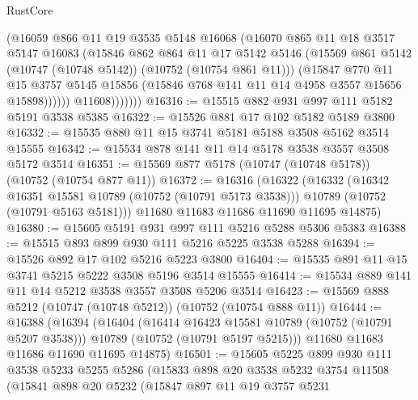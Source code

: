 \begin{lexlean}{RustCore}
\begin{coremodule}
                    (@16059
                      @866
                      @11
                      @19
                      @3535
                      @5148
                      @16068
                      (@16070
                        @865
                        @11
                        @18
                        @3517
                        @5147
                        @16083
                        (@15846
                          @862
                          @864
                          @11
                          @17
                          @5142
                          @5146
                          (@15569 @861 @5142 (@10747 (@10748 @5142)) (@10752 (@10754 @861 @11)))
                          (@15847
                            @770
                            @11
                            @15
                            @3757
                            @5145
                            @15856
                            (@15846 @768 @141 @11 @14 @4958 @3557 @15656 @15898))))))
                  @11608)))))))
@16316 := @15515 @882 @931 @997 @111 @5182 @5191 @3538 @5385
@16322 := @15526 @881 @17 @102 @5182 @5189 @3800
@16332 := @15535 @880 @11 @15 @3741 @5181 @5188 @3508 @5162 @3514 @15555
@16342 := @15534 @878 @141 @11 @14 @5178 @3538 @3557 @3508 @5172 @3514
@16351 := @15569 @877 @5178 (@10747 (@10748 @5178)) (@10752 (@10754 @877 @11))
@16372 := @16316
    (@16322
      (@16332
        (@16342 @16351 @15581 @10789 (@10752 (@10791 @5173 @3538)))
        @10789
        (@10752 (@10791 @5163 @5181)))
      @11680
      @11683
      @11686
      @11690
      @11695
      @14875)
@16380 := @15605 @5191 @931 @997 @111 @5216 @5288 @5306 @5383
@16388 := @15515 @893 @899 @930 @111 @5216 @5225 @3538 @5288
@16394 := @15526 @892 @17 @102 @5216 @5223 @3800
@16404 := @15535 @891 @11 @15 @3741 @5215 @5222 @3508 @5196 @3514 @15555
@16414 := @15534 @889 @141 @11 @14 @5212 @3538 @3557 @3508 @5206 @3514
@16423 := @15569 @888 @5212 (@10747 (@10748 @5212)) (@10752 (@10754 @888 @11))
@16444 := @16388
    (@16394
      (@16404
        (@16414 @16423 @15581 @10789 (@10752 (@10791 @5207 @3538)))
        @10789
        (@10752 (@10791 @5197 @5215)))
      @11680
      @11683
      @11686
      @11690
      @11695
      @14875)
@16501 := @15605
    @5225
    @899
    @930
    @111
    @3538
    @5233
    @5255
    @5286
    (@15833
      @898
      @20
      @3538
      @5232
      @3754
      @11508
      (@15841
        @898
        @20
        @5232
        (@15847
          @897
          @11
          @19
          @3757
          @5231

\end{coremodule}
\end{lexlean}
